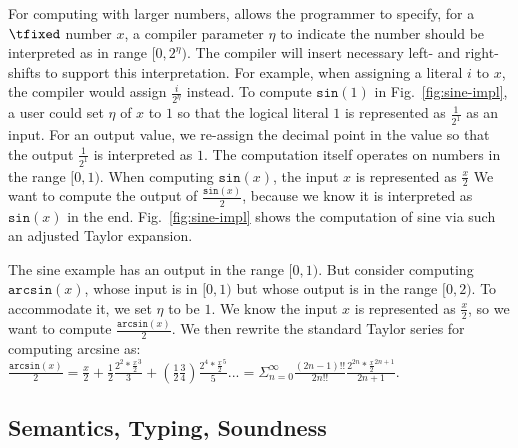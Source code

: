 For computing with larger numbers, \qvm allows the programmer to
specify, for a $\tfixed$ number $x$, a compiler parameter $\eta$ to
indicate the number should be interpreted as in range
$[0,2^\eta)$. The compiler will insert necessary left- and
right-shifts to support this interpretation. For example, when
assigning a literal $i$ to $x$, the compiler would assign
$\frac{i}{2^{\eta}}$ instead. To compute $\texttt{sin}(1)$ in
Fig.~\ref{fig:sine-impl}, a user could set $\eta$ of $x$ to $1$ so
that the logical literal $1$ is represented as
$\frac{1}{2^1}$ as an input.
For an output value, we re-assign the decimal point in the value so that the output $\frac{1}{2^1}$ is interpreted as $1$.
The computation itself operates on numbers in the range $[0,1)$.
When computing $\texttt{sin}(x)$, the input $x$ is represented as $\frac{x}{2}$
We want to compute the output of $\frac{\texttt{sin}(x)}{2}$, because we know it is interpreted as $\texttt{sin}(x)$ in the end.
Fig.~\ref{fig:sine-impl} shows the computation of sine via such an adjusted Taylor expansion.

The sine example has an output in the range $[0,1)$.
But consider computing $\texttt{arcsin}(x)$, whose input is in $[0,1)$
but whose output is in the range $[0,2)$. To accommodate it, we set $\eta$ to be $1$.
We know the input $x$ is represented as $\frac{x}{2}$,
so we want to compute $\frac{\texttt{arcsin}(x)}{2}$. 
We then rewrite the standard Taylor series for computing arcsine as: $\frac{\texttt{arcsin}(x)}{2}=\frac{x}{2}+\frac{1}{2}\frac{2^2*\frac{x}{2}^3}{3}+(\frac{1}{2}\frac{3}{4})\frac{2^4*\frac{x}{2}^5}{5}...=\Sigma^{\infty}_{n=0}\frac{(2n-1)!!}{2n!!}\frac{2^{2n}*\frac{x}{2}^{2n+1}}{2n+1}$.


\subsection{Semantics, Typing, Soundness}\label{sec:qimp-sem}

